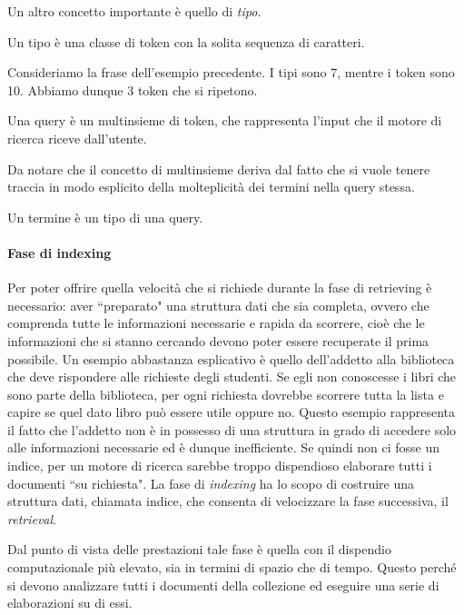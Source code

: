 Un altro concetto importante è quello di \textit{tipo}.

\begin{definizione}[tipo]\label{def:tipo}
	Un tipo è una classe di token con la solita sequenza di caratteri.
\end{definizione}
\begin{esempio}
	Consideriamo la frase dell'esempio precedente. I tipi sono 7, mentre i token sono 10. Abbiamo dunque
	3 token che si ripetono.
\end{esempio}
\begin{definizione}[query]\label{def:query}
	Una query è un multinsieme di token, che rappresenta l'input che il motore di ricerca
	riceve dall'utente. 
\end{definizione}
Da notare che il concetto di multinsieme deriva dal fatto che si vuole tenere traccia in modo esplicito 
della molteplicità
dei termini nella query stessa.

\begin{definizione}[termine]\label{def:temine}
	Un termine è un tipo di una query.
\end{definizione}

\paragraph{Fase di indexing}
Per poter offrire quella velocità che si richiede durante la fase di retrieving è necessario: aver ``preparato"
una struttura dati che sia completa, ovvero che comprenda tutte le informazioni necessarie e 
rapida da scorrere, cioè che le informazioni che si stanno cercando devono poter essere recuperate
il prima possibile.  Un esempio abbastanza esplicativo è quello dell'addetto alla biblioteca che deve rispondere
alle richieste degli studenti. Se egli non conoscesse i libri che sono parte della biblioteca, per ogni richiesta
dovrebbe scorrere tutta la lista e capire se quel dato libro può essere utile oppure no.
Questo esempio rappresenta il fatto che l'addetto non è in possesso di una struttura in grado
di accedere solo alle informazioni necessarie ed è dunque inefficiente.
Se quindi non ci fosse un indice, per un motore di ricerca sarebbe troppo dispendioso elaborare tutti
i documenti ``su richiesta".
La fase di \textit{indexing} ha lo scopo di costruire una struttura dati, chiamata indice, che consenta
di velocizzare la fase successiva, il \textit{retrieval}.

Dal punto di vista delle prestazioni tale fase è quella con il  dispendio computazionale
più elevato, sia in termini di spazio che di tempo.
Questo perché si devono analizzare tutti i documenti della collezione ed eseguire una serie di elaborazioni
su di essi.

